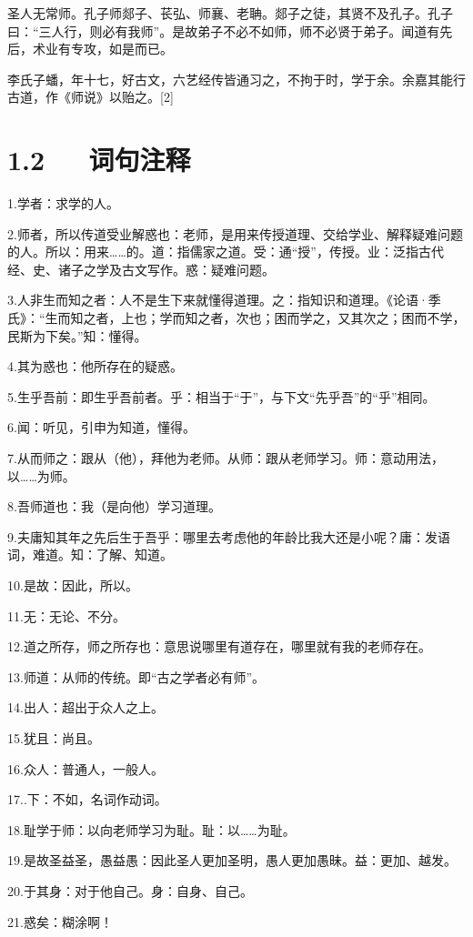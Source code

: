 \documentclass[letterpaper,12pt,english]{sphinxmanual}
\begin{document}
圣人无常师。孔子师郯子、苌弘、师襄、老聃。郯子之徒，其贤不及孔子。孔子曰：“三人行，则必有我师”。是故弟子不必不如师，师不必贤于弟子。闻道有先后，术业有专攻，如是而已。

李氏子蟠，年十七，好古文，六艺经传皆通习之，不拘于时，学于余。余嘉其能行古道，作《师说》以贻之。{[}2{]}


\section{1.2   词句注释}
\label{\detokenize{p01_u6563_u6587/_u97e9_u6108-_u5e08_u8bf4:id4}}
1.学者：求学的人。

2.师者，所以传道受业解惑也：老师，是用来传授道理、交给学业、解释疑难问题的人。所以：用来……的。道：指儒家之道。受：通“授”，传授。业：泛指古代经、史、诸子之学及古文写作。惑：疑难问题。

3.人非生而知之者：人不是生下来就懂得道理。之：指知识和道理。《论语·季氏》：“生而知之者，上也；学而知之者，次也；困而学之，又其次之；困而不学，民斯为下矣。”知：懂得。

4.其为惑也：他所存在的疑惑。

5.生乎吾前：即生乎吾前者。乎：相当于“于”，与下文“先乎吾”的“乎”相同。

6.闻：听见，引申为知道，懂得。

7.从而师之：跟从（他），拜他为老师。从师：跟从老师学习。师：意动用法，以……为师。

8.吾师道也：我（是向他）学习道理。

9.夫庸知其年之先后生于吾乎：哪里去考虑他的年龄比我大还是小呢？庸：发语词，难道。知：了解、知道。

10.是故：因此，所以。

11.无：无论、不分。

12.道之所存，师之所存也：意思说哪里有道存在，哪里就有我的老师存在。

13.师道：从师的传统。即“古之学者必有师”。

14.出人：超出于众人之上。

15.犹且：尚且。

16.众人：普通人，一般人。

17..下：不如，名词作动词。

18.耻学于师：以向老师学习为耻。耻：以……为耻。

19.是故圣益圣，愚益愚：因此圣人更加圣明，愚人更加愚昧。益：更加、越发。

20.于其身：对于他自己。身：自身、自己。

21.惑矣：糊涂啊！
\end{document}
